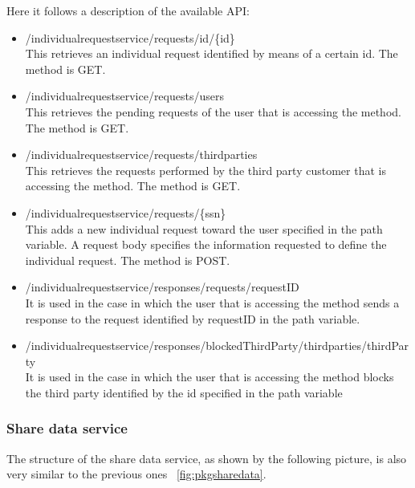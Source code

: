 Here it follows a description of the available API:
\begin{itemize}
\item /individualrequestservice/requests/id/\{id\} \\
This retrieves an individual request identified by means of a certain id. 
The method is GET.

\item /individualrequestservice/requests/users \\ 
This retrieves the pending requests of the user that is accessing the method. 
The method is GET.

\item /individualrequestservice/requests/thirdparties \\ 
This retrieves the requests performed by the third party customer that is accessing the method.
The method is GET.

\item /individualrequestservice/requests/\{ssn\} \\
This adds a new individual request toward the user specified in the path variable.
A request body specifies the information requested to define the individual request.
The method is POST. 

\item /individualrequestservice/responses/requests/{requestID} \\
It is used in the case in which the user that is accessing the method
sends a response to the request identified by requestID in the path variable.

\item /individualrequestservice/responses/blockedThirdParty/thirdparties/{thirdParty} \\
It is used in the case in which the user that is accessing the method blocks the third party identified by the id specified in the path variable
\end{itemize}

\subsubsection{Share data service}
The structure of the share data service, as shown by the following picture, is also very similar to the previous ones 
~\ref{fig:pkgsharedata}.

